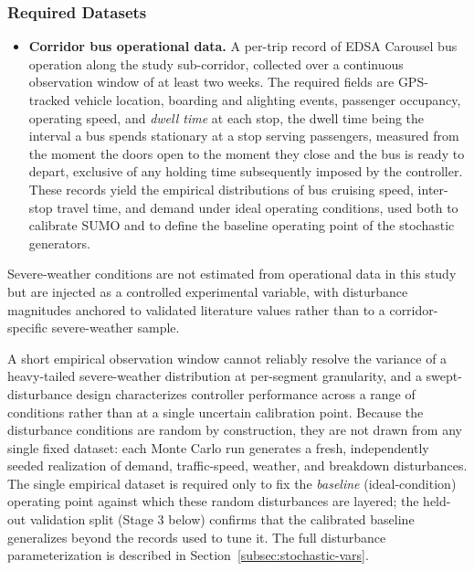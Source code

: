 \subsubsection{Required Datasets}

\begin{itemize}

\item \textbf{Corridor bus operational data.} A per-trip record of EDSA Carousel bus operation along the study sub-corridor, collected over a continuous observation window of at least two weeks. The required fields are GPS-tracked vehicle location, boarding and alighting events, passenger occupancy, operating speed, and \textit{dwell time} at each stop, the dwell time being the interval a bus spends stationary at a stop serving passengers, measured from the moment the doors open to the moment they close and the bus is ready to depart, exclusive of any holding time subsequently imposed by the controller. These records yield the empirical distributions of bus cruising speed, inter-stop travel time, and demand under ideal operating conditions, used both to calibrate SUMO and to define the baseline operating point of the stochastic generators. 


\end{itemize}

Severe-weather conditions are not estimated from operational data in this study but are injected as a controlled experimental variable, with disturbance magnitudes anchored to validated literature values rather than to a corridor-specific severe-weather sample.

A short empirical observation window cannot reliably resolve the variance of a heavy-tailed severe-weather distribution at per-segment granularity, and a swept-disturbance design characterizes controller performance across a range of conditions rather than at a single uncertain calibration point. Because the disturbance conditions are random by construction, they are not drawn from any single fixed dataset: each Monte Carlo run generates a fresh, independently seeded realization of demand, traffic-speed, weather, and breakdown disturbances. The single empirical dataset is required only to fix the \textit{baseline} (ideal-condition) operating point against which these random disturbances are layered; the held-out validation split (Stage 3 below) confirms that the calibrated baseline generalizes beyond the records used to tune it. The full disturbance parameterization is described in Section~\ref{subsec:stochastic-vars}.

